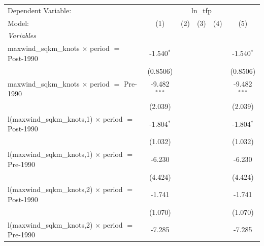 \begingroup
\centering
\begin{tabular}{lccccc}
   \tabularnewline \midrule \midrule
   Dependent Variable: & \multicolumn{5}{c}{ln\_tfp}\\
   Model:                                                     & (1)            & (2)                     & (3)            & (4)                     & (5)\\  
   \midrule
   \emph{Variables}\\
   maxwind\_sqkm\_knots $\times$ period $=$ Post-1990         & -1.540$^{*}$   &                         &                &                         & -1.540$^{*}$\\   
                                                              & (0.8506)       &                         &                &                         & (0.8506)\\   
   maxwind\_sqkm\_knots $\times$ period $=$ Pre-1990          & -9.482$^{***}$ &                         &                &                         & -9.482$^{***}$\\   
                                                              & (2.039)        &                         &                &                         & (2.039)\\   
   l(maxwind\_sqkm\_knots,1) $\times$ period $=$ Post-1990    & -1.804$^{*}$   &                         &                &                         & -1.804$^{*}$\\   
                                                              & (1.032)        &                         &                &                         & (1.032)\\   
   l(maxwind\_sqkm\_knots,1) $\times$ period $=$ Pre-1990     & -6.230         &                         &                &                         & -6.230\\   
                                                              & (4.424)        &                         &                &                         & (4.424)\\   
   l(maxwind\_sqkm\_knots,2) $\times$ period $=$ Post-1990    & -1.741         &                         &                &                         & -1.741\\   
                                                              & (1.070)        &                         &                &                         & (1.070)\\   
   l(maxwind\_sqkm\_knots,2) $\times$ period $=$ Pre-1990     & -7.285         &                         &                &                         & -7.285\\   

\end{tabular}
